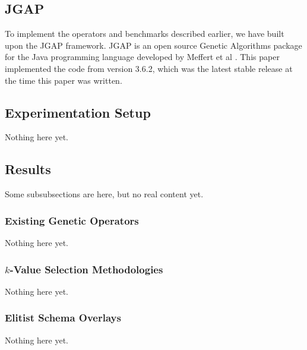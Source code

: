 \subsection*{JGAP}
To implement the operators and benchmarks described earlier, we have built upon the JGAP framework. JGAP is an open source Genetic Algorithms package for the Java programming language developed by Meffert et al \cite{jgap}. This paper implemented the code from version 3.6.2, which was the latest stable release at the time this paper was written.

\subsection*{Experimentation Setup}
Nothing here yet.

\subsection*{Results}
Some subsubsections are here, but no real content yet.

\subsubsection*{Existing Genetic Operators}
Nothing here yet.

\subsubsection*{$k$-Value Selection Methodologies}
Nothing here yet.

\subsubsection*{Elitist Schema Overlays}
Nothing here yet.